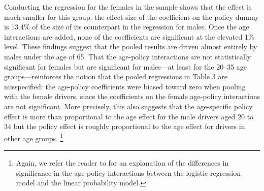 Conducting the regression for the females in the sample shows that 
the effect is much smaller for this group: 
the effect size of the coefficient on the policy dummy is 13.4\% of the size of its counterpart 
in the regression for males. 
Once the age interactions are added, none of the coefficients are significant at the elevated 1\% level. 
These findings suggest that the pooled results are driven almost entirely by males under the age of 65.
%
That the age-policy interactions are not statistically significant for females 
but are significant for males---at least for the 20--35 age groups---reinforces 
the notion that the pooled regressions in Table 3 are misspecified:
% 
the age-policy coefficients were biased toward zero 
when pooling with the female drivers, 
since the coefficients on the female age-policy interactions are not significant.
%  
More precisely, %
this also 
suggests that the age-specific policy effect is more than proportional to the age effect
for the male drivers aged 20 to 34
but the policy effect is roughly proportional to the age effect
for drivers in other age groups.%
\footnote{%
% 
Again, we refer the reader to \citet{ainorton2003}
for an explanation of the differences in significance in the age-policy interactions between the logistic regression model and the linear probability model. 
}
%

